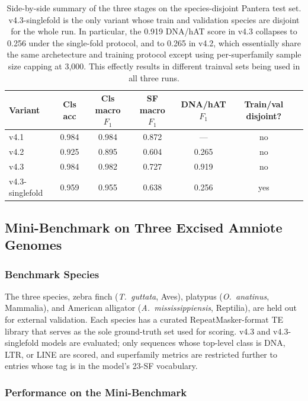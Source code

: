 \documentclass[12pt]{article}
\begin{document}
\begin{table}[h]
\centering
\small
\caption{Side-by-side summary of the three stages on the species-disjoint Pantera test set. v4.3-singlefold is the only variant whose train and validation species are disjoint for the whole run. In particular, the 0.919 DNA/hAT score in v4.3 collapses to 0.256 under the single-fold protocol, and to 0.265 in v4.2, which essentially share the same archetecture and training protocol except using per-superfamily sample size capping at 3{,}000. This effectly results in different trainval sets being used in all three runs. }
\label{tab:stage_compare}
\begin{tabular}{lcccccc}
\toprule
Variant & Cls acc & Cls macro $F_1$ & SF macro $F_1$ & DNA/hAT $F_1$ & Train/val disjoint? \\
\midrule
v4.1 & 0.984 & 0.984 & 0.872 & --- & no \\
v4.2 & 0.925 & 0.895 & 0.604 & 0.265 & no \\
v4.3 & 0.984 & 0.982 & 0.727 & 0.919 & no \\
v4.3-singlefold & 0.959 & 0.955 & 0.638 & 0.256 & yes \\
\bottomrule
\end{tabular}
\end{table}


\subsection{Mini-Benchmark on Three Excised Amniote Genomes}\label{ssec:mini_benchmark}

\subsubsection{Benchmark Species}

The three species, zebra finch (\textit{T.~guttata}, Aves), platypus (\textit{O.~anatinus}, Mammalia), and American alligator (\textit{A.~mississippiensis}, Reptilia), are held out for external validation. Each species has a curated RepeatMasker-format TE library that serves as the sole ground-truth set used for scoring. v4.3 and v4.3-singlefold models are evaluated; only sequences whose top-level class is DNA, LTR, or LINE are scored, and superfamily metrics are restricted further to entries whose tag is in the model's 23-SF vocabulary.

\subsubsection{Performance on the Mini-Benchmark}
\end{document}
